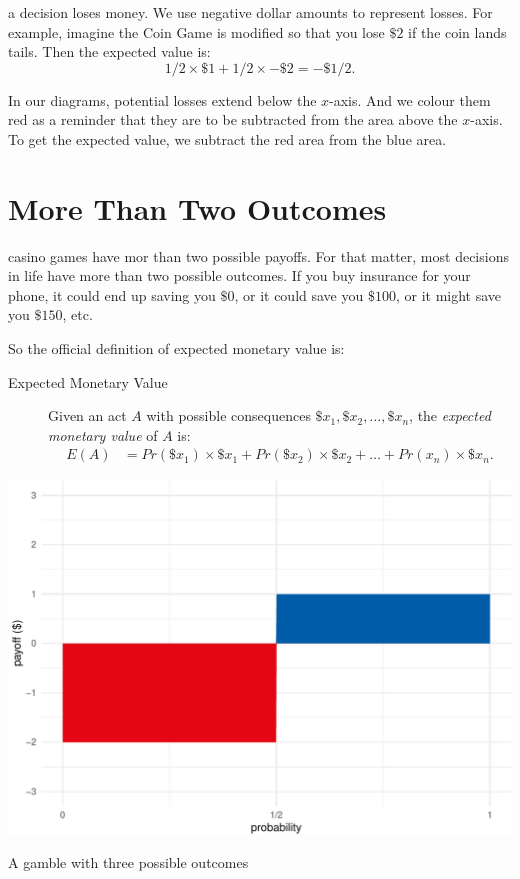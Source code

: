 \documentclass[justified]{tufte-book}
\newcommand{\p}{Pr}
\newcommand{\E}{E}
\theoremstyle{definition}
\theoremstyle{definition}
\theoremstyle{definition}
\theoremstyle{remark}
\begin{document}
 a decision loses money. We use negative dollar
amounts to represent losses. For example, imagine the Coin Game is
modified so that you lose \(\$2\) if the coin lands tails. Then the
expected value is: \[ 1/2 \times \$1 + 1/2 \times -\$2 = -\$1/2.\]

In our diagrams, potential losses extend below the \(x\)-axis. And we
colour them red as a reminder that they are to be subtracted from the
area above the \(x\)-axis. To get the expected value, we subtract the
red area from the blue area.

\hypertarget{more-than-two-outcomes}{%
\section{More Than Two Outcomes}\label{more-than-two-outcomes}}

 casino games have mor than two possible payoffs. For
that matter, most decisions in life have more than two possible
outcomes. If you buy insurance for your phone, it could end up saving
you \(\$0\), or it could save you \(\$100\), or it might save you
\(\$150\), etc.

So the official definition of expected monetary value is:

\begin{description}
\item[Expected Monetary Value]
Given an act \(A\) with possible consequences
\(\$x_1, \$x_2, \ldots, \$x_n\), the \emph{expected monetary value} of
\(A\) is: \[
  \begin{aligned}
\E(A) &= \p(\$x_1) \times \$x_1 + \p(\$x_2) \times \$x_2 + \ldots + \p(x_n) \times \$x_n.
  \end{aligned}
\]
\end{description}

\begin{marginfigure}
\includegraphics{_main_files/figure-latex/unnamed-chunk-94-1} \caption[A gamble with three possible outcomes]{A gamble with three possible outcomes}\label{fig:unnamed-chunk-94}
\end{marginfigure}
\end{document}
